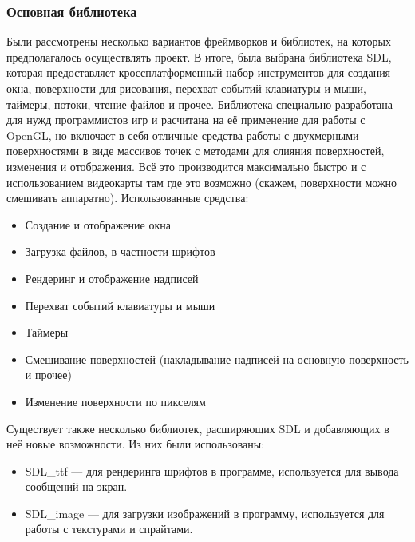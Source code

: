 \documentclass[a4paper,12pt]{report}
\numberwithin{equation}{section}
\begin{document}
\subsubsection{Основная библиотека}
Были рассмотрены несколько вариантов фреймворков и библиотек, на которых предполагалось осуществлять проект. В итоге, была выбрана библиотека SDL, которая предоставляет кроссплатформенный набор инструментов для создания окна, поверхности для рисования, перехват событий клавиатуры и мыши, таймеры, потоки, чтение файлов и прочее. Библиотека специально разработана для нужд программистов игр и расчитана на её применение для работы с OpenGL, но включает в себя отличные средства работы с двухмерными поверхностями в виде массивов точек с методами для слияния поверхностей, изменения и отображения. Всё это производится максимально быстро и с использованием видеокарты там где это возможно (скажем, поверхности можно смешивать аппаратно). Использованные средства:
\begin{itemize}
\item Создание и отображение окна
\item Загрузка файлов, в частности шрифтов
\item Рендеринг и отображение надписей
\item Перехват событий клавиатуры и мыши
\item Таймеры
\item Смешивание поверхностей (накладывание надписей на основную поверхность и прочее)
\item Изменение поверхности по пикселям
\end{itemize}
Существует также несколько библиотек, расширяющих SDL и добавляющих в неё новые возможности. Из них были использованы:
\begin{itemize}
\item SDL\_ttf --- для рендеринга шрифтов в программе, используется для вывода сообщений на экран.
\item SDL\_image --- для загрузки изображений в программу, используется для работы с текстурами и спрайтами.
\end{itemize}
\end{document}

